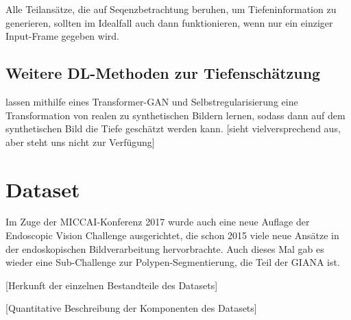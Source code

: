 Alle Teilansätze, die auf Seqenzbetrachtung beruhen, um Tiefeninformation zu generieren, sollten im Idealfall auch dann funktionieren, wenn nur ein einziger Input-Frame gegeben wird.

\subsection{Weitere DL-Methoden zur Tiefenschätzung}

\citeauthor{Mahmood.20171129} lassen mithilfe eines Transformer-GAN und Selbstregularisierung eine Transformation von realen zu synthetischen Bildern lernen, sodass dann auf dem synthetischen Bild die Tiefe geschätzt werden kann.
[sieht vielversprechend aus, aber steht uns nicht zur Verfügung]

\section{Dataset}

Im Zuge der MICCAI-Konferenz 2017 wurde auch eine neue Auflage der Endoscopic Vision Challenge ausgerichtet, die schon 2015 viele neue Ansätze in der endoskopischen Bildverarbeitung hervorbrachte.
Auch dieses Mal gab es wieder eine Sub-Challenge zur Polypen-Segmentierung, die Teil der GIANA ist.

[Herkunft der einzelnen Bestandteile des Datasets]

[Quantitative Beschreibung der Komponenten des Datasets]
